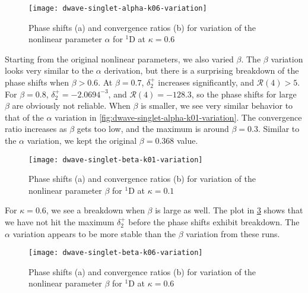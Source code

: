 \documentclass[Dissertation.tex]{subfiles}
\begin{document}
\begin{figure}
	\centering
	\texttt{[image: dwave-singlet-alpha-k06-variation]}
	\caption[Variation of the nonlinear parameter $\alpha$ for $^{1}$D at $\kappa = 0.6$]{Phase shifts (a) and convergence ratios (b) for variation of the nonlinear parameter $\alpha$ for $^{1}$D at $\kappa = 0.6$}
	\label{fig:dwave-singlet-alpha-k06-variation}
\end{figure}

Starting from the original nonlinear parameters, we also varied $\beta$. The
$\beta$ variation looks very similar to the $\alpha$ derivation, but there is
a surprising breakdown of the phase shifts when $\beta > 0.6$. At $\beta = 0.7$,
$\delta_2^+$ increases significantly, and $\mathcal{R}(4) > 5$. For $\beta = 0.8$,
$\delta_2^+ = -2.0694^{-3}$, and $\mathcal{R}(4) = -128.3$, so the phase shifts
for large $\beta$ are obviously not reliable. When $\beta$ is smaller, we see
very similar behavior to that of the $\alpha$ variation in
\cref{fig:dwave-singlet-alpha-k01-variation}. The convergence ratio increases as
$\beta$ gets too low, and the maximum is around $\beta = 0.3$. Similar to the
$\alpha$ variation, we kept the original $\beta = 0.368$ value.

\begin{figure}
	\centering
	\texttt{[image: dwave-singlet-beta-k01-variation]}
	\caption[Variation of the nonlinear parameter $\beta$ for $^{1}$D at $\kappa = 0.1$]{Phase shifts (a) and convergence ratios (b) for variation of the nonlinear parameter $\beta$ for $^{1}$D at $\kappa = 0.1$}
	\label{fig:dwave-singlet-beta-k01-variation}
\end{figure}

For $\kappa = 0.6$, we see a breakdown when $\beta$ is large as well. The plot
in \cref{fig:dwave-singlet-beta-k06-variation} shows that we have not hit the maximum
$\delta_2^+$ before the phase shifts exhibit breakdown. The $\alpha$ variation
appears to be more stable than the $\beta$ variation from these runs.

\begin{figure}
	\centering
	\texttt{[image: dwave-singlet-beta-k06-variation]}
	\caption[Variation of the nonlinear parameter $\beta$ for $^{1}$D at $\kappa = 0.6$]{Phase shifts (a) and convergence ratios (b) for variation of the nonlinear parameter $\beta$ for $^{1}$D at $\kappa = 0.6$}
	\label{fig:dwave-singlet-beta-k06-variation}
\end{figure}
\end{document}

